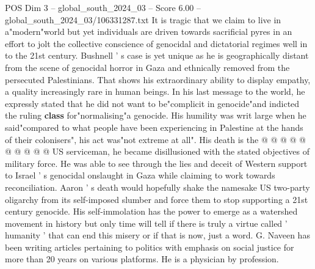 \begin{textsample}{POS Dim 3 – global\_south\_2024\_03 – Score 6.00 – global\_south\_2024\_03/106331287.txt}
It is tragic that we claim to live in a"modern"world but yet individuals are driven towards sacrificial pyres in an effort to jolt the collective conscience of genocidal and dictatorial regimes well in to the 21st century.
Bushnell ' s case is yet unique as he is geographically distant from the scene of genocidal horror in Gaza and ethnically removed from the persecuted Palestinians.
That shows his extraordinary ability to display empathy, a quality increasingly rare in human beings.
In his last message to the world, he expressly stated that he did not want to be"complicit in genocide"and indicted the ruling \textbf{class} for"normalising"a genocide.
His humility was writ large when he said"compared to what people have been experiencing in Palestine at the hands of their colonisers", his act was"not extreme at all".
His death is the @ @ @ @ @ @ @ @ @ @ US serviceman, he became disillusioned with the stated objectives of military force.
He was able to see through the lies and deceit of Western support to Israel ' s genocidal onslaught in Gaza while claiming to work towards reconciliation.
Aaron ' s death would hopefully shake the namesake US two-party oligarchy from its self-imposed slumber and force them to stop supporting a 21st century genocide.
His self-immolation has the power to emerge as a watershed movement in history but only time will tell if there is truly a virtue called ' humanity ' that can end this misery or if that is now, just a word.
G.
Naveen has been writing articles pertaining to politics with emphasis on social justice for more than 20 years on various platforms.
He is a physician by profession.

\end{textsample}
